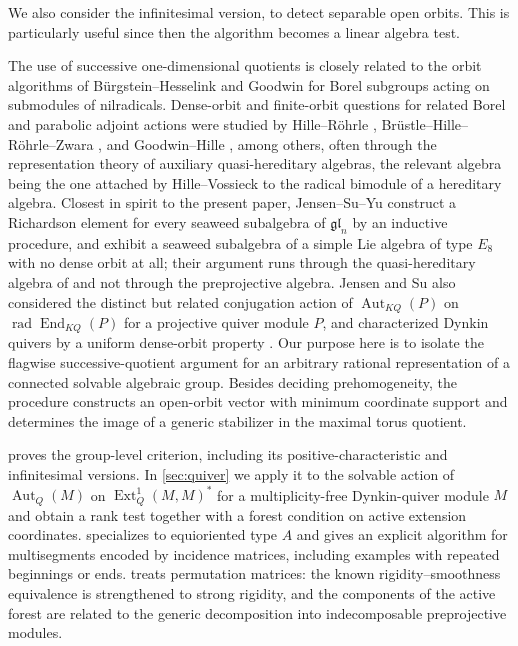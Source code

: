 \documentclass[12pt]{article}
\newcommand{\Ext}{\operatorname{Ext}}
\newcommand{\End}{\operatorname{End}}
\newcommand{\Aut}{\operatorname{Aut}}
\begin{document}
We also consider the infinitesimal version, to detect separable open orbits. This is particularly useful since then the algorithm
becomes a linear algebra test.

The use of successive one-dimensional quotients is closely related to the
orbit algorithms of B\"urgstein--Hesselink \cite{MR879187} and Goodwin \cite{MR2123984} for Borel subgroups acting on
submodules of nilradicals.  Dense-orbit and finite-orbit questions for related Borel and
parabolic adjoint actions were studied by Hille--R\"ohrle \cite{MR1669178},
Br\"ustle--Hille--R\"ohrle--Zwara \cite{MR1736958}, and Goodwin--Hille \cite{MR2356319}, among others, often through the representation
theory of auxiliary quasi-hereditary algebras, the relevant algebra being the one attached by
Hille--Vossieck \cite{MR2033108} to the radical bimodule of a hereditary algebra.
Closest in spirit to the present paper, Jensen--Su--Yu \cite{MR2481983} construct a Richardson
element for every seaweed subalgebra of $\mathfrak{gl}_n$ by an inductive procedure, and exhibit a seaweed
subalgebra of a simple Lie algebra of type $E_8$ with no dense orbit at all; their argument runs
through the quasi-hereditary algebra of \cite{MR2033108} and not through the preprojective algebra.
Jensen and Su also considered the distinct but
related conjugation action of $\Aut_{KQ}(P)$ on $\operatorname{rad}\End_{KQ}(P)$ for a projective quiver
module $P$, and characterized Dynkin quivers by a uniform dense-orbit property \cite{MR3228477}.  Our
purpose here is to isolate the flagwise successive-quotient argument for an arbitrary
rational representation of a connected solvable algebraic group.  Besides deciding
prehomogeneity, the procedure constructs an open-orbit vector with minimum coordinate
support and determines the image of a generic stabilizer in the maximal torus quotient.

 proves the group-level criterion, including its
positive-characteristic and infinitesimal versions.  In \cref{sec:quiver} we apply it to the
solvable action of $\Aut_Q(M)$ on $\Ext^1_Q(M,M)^*$ for a multiplicity-free Dynkin-quiver
module $M$ and obtain a rank test together with a forest condition on active extension
coordinates.   specializes to equioriented type $A$ and gives an explicit
algorithm for multisegments encoded by incidence matrices, including examples with
repeated beginnings or ends.  treats permutation matrices: the known
rigidity--smoothness equivalence is strengthened to strong rigidity, and the components of
the active forest are related to the generic decomposition into indecomposable
preprojective modules.
\end{document}
